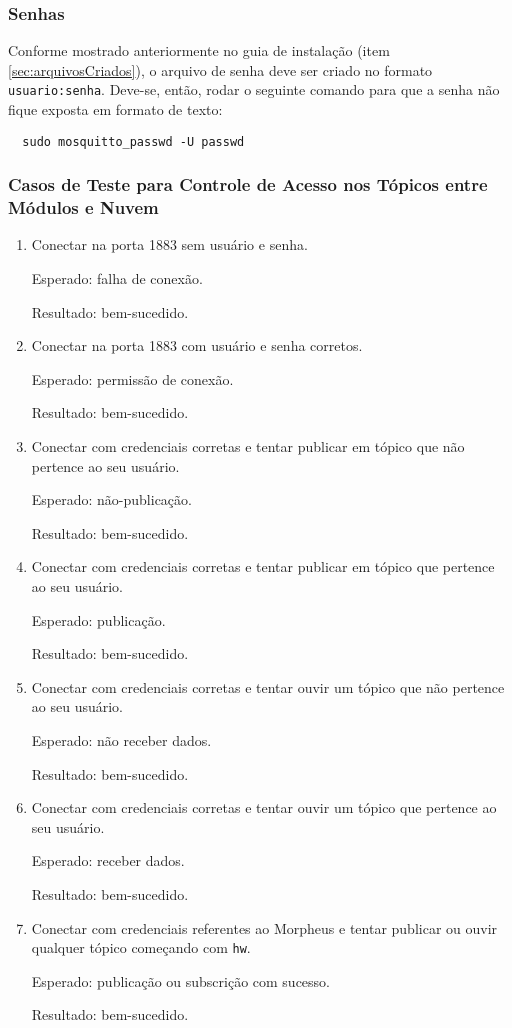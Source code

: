 \subsubsection{Senhas}

Conforme mostrado anteriormente no guia de instalação (item \ref{sec:arquivosCriados}), o arquivo de senha deve ser criado no formato \lstinline{usuario:senha}. Deve-se, então, rodar o seguinte comando para que a senha não fique exposta em formato de texto:

\begin{lstlisting}
  sudo mosquitto_passwd -U passwd
\end{lstlisting}

\subsubsection{Casos de Teste para Controle de Acesso nos Tópicos \wmqtt{} entre Módulos e Nuvem \label{testesTopicos}}
\begin{enumerate}
\item
Conectar na porta 1883 sem usuário e senha.

Esperado: falha de conexão.

Resultado: bem-sucedido.
\item Conectar na porta 1883 com usuário e senha corretos.

Esperado: permissão de conexão.

Resultado: bem-sucedido.
\item
Conectar com credenciais corretas e tentar publicar em tópico que não pertence ao seu usuário.

Esperado: não-publicação.

Resultado: bem-sucedido.
\item
Conectar com credenciais corretas e tentar publicar em tópico que pertence ao seu usuário.

Esperado: publicação.

Resultado: bem-sucedido.
\item
Conectar com credenciais corretas e tentar ouvir um tópico que não pertence ao seu usuário.

Esperado: não receber dados.

Resultado: bem-sucedido.
\item
Conectar com credenciais corretas e tentar ouvir um tópico que pertence ao seu usuário.

Esperado: receber dados.

Resultado: bem-sucedido.

\item
Conectar com credenciais referentes ao Morpheus e tentar publicar ou ouvir qualquer tópico começando com \texttt{hw}.

Esperado: publicação ou subscrição com sucesso.

Resultado: bem-sucedido.
\end{enumerate}
